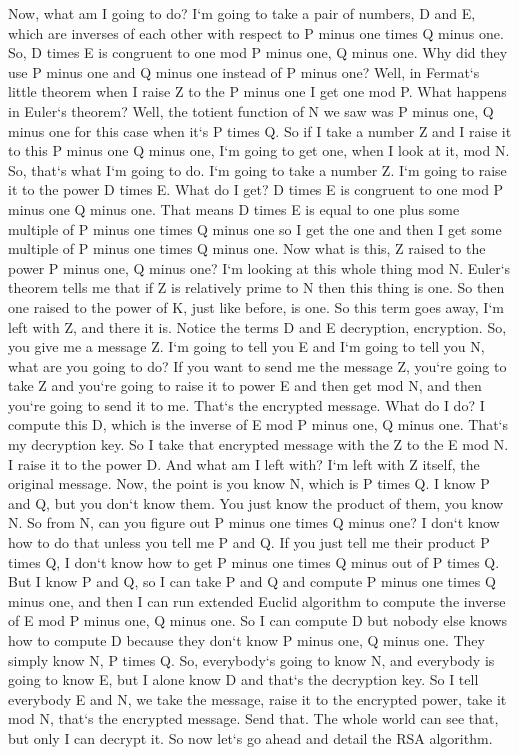 Now, what am I going to do? I`m going to take a pair of numbers, D and E, which are inverses of each other with respect to P minus one times Q minus one.
So, D times E is congruent to one mod P minus one, Q minus one.
Why did they use P minus one and Q minus one instead of P minus one? Well, in Fermat`s little theorem when I raise Z to the P minus one I get one mod P\@.
What happens in Euler`s theorem? Well, the totient function of N we saw was P minus one, Q minus one for this case when it`s P times Q\@.
So if I take a number Z and I raise it to this P minus one Q minus one, I`m going to get one, when I look at it, mod N\@.
So, that`s what I`m going to do.
I`m going to take a number Z\@.
I`m going to raise it to the power D times E\@.
What do I get? D times E is congruent to one mod P minus one Q minus one.
That means D times E is equal to one plus some multiple of P minus one times Q minus one so I get the one and then I get some multiple of P minus one times Q minus one.
Now what is this, Z raised to the power P minus one, Q minus one? I`m looking at this whole thing mod N\@.
Euler`s theorem tells me that if Z is relatively prime to N then this thing is one.
So then one raised to the power of K, just like before, is one.
So this term goes away, I`m left with Z, and there it is.
Notice the terms D and E decryption, encryption.
So, you give me a message Z\@.
I`m going to tell you E and I`m going to tell you N, what are you going to do? If you want to send me the message Z, you`re going to take Z and you`re going to raise it to power E and then get mod N, and then you`re going to send it to me.
That`s the encrypted message.
What do I do? I compute this D, which is the inverse of E mod P minus one, Q minus one.
That`s my decryption key.
So I take that encrypted message with the Z to the E mod N\@.
I raise it to the power D\@.
And what am I left with? I`m left with Z itself, the original message.
Now, the point is you know N, which is P times Q\@.
I know P and Q, but you don`t know them.
You just know the product of them, you know N\@.
So from N, can you figure out P minus one times Q minus one? I don`t know how to do that unless you tell me P and Q\@.
If you just tell me their product P times Q, I don`t know how to get P minus one times Q minus out of P times Q\@.
But I know P and Q, so I can take P and Q and compute P minus one times Q minus one, and then I can run extended Euclid algorithm to compute the inverse of E mod P minus one, Q minus one.
So I can compute D but nobody else knows how to compute D because they don`t know P minus one, Q minus one.
They simply know N, P times Q\@.
So, everybody`s going to know N, and everybody is going to know E, but I alone know D and that`s the decryption key.
So I tell everybody E and N, we take the message, raise it to the encrypted power, take it mod N, that`s the encrypted message.
Send that.
The whole world can see that, but only I can decrypt it.
So now let`s go ahead and detail the RSA algorithm.

